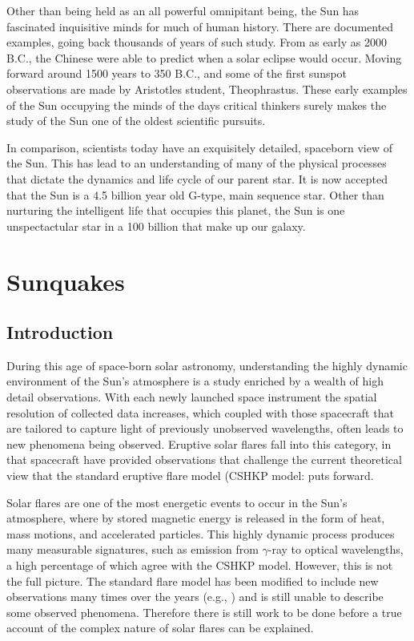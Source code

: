 Other than being held as an all powerful omnipitant being, the Sun has fascinated inquisitive minds for much of human history. There are documented examples, going back thousands of years of such study. From as early as 2000 B.C., the Chinese were able to predict when a solar eclipse would occur. Moving forward around 1500 years to 350 B.C., and some of the first sunspot observations are made by Aristotles student, Theophrastus. These early examples of the Sun occupying the minds of the days critical thinkers surely makes the study of the Sun one of the oldest scientific pursuits.      


In comparison, scientists today have an exquisitely detailed, spaceborn view of the Sun. This has lead to an understanding of many of the physical processes that dictate the dynamics and life cycle of our parent star. It is now accepted that the Sun is a 4.5 billion year old G-type, main sequence star. Other than nurturing the intelligent life that occupies this planet, the Sun is one unspectactular star in a 100 billion that make up our galaxy.

\section{Sunquakes}
\subsection{Introduction}


During this age of space-born solar astronomy, understanding the highly dynamic environment of the Sun's atmosphere is a study enriched by a wealth of high detail observations. With each newly launched space instrument the spatial resolution of collected data increases, which coupled with those spacecraft that are tailored to capture light of previously unobserved wavelengths, often leads to new phenomena being observed. Eruptive solar flares fall into this category, in that spacecraft have provided observations that challenge the current theoretical view that the standard eruptive flare model (CSHKP model: \citep{1964NASSP..50..451C, 1966Natur.211..695S, 1974SoPh...34..323H, 1976SoPh...50...85K} puts forward.

Solar flares are one of the most energetic events to occur in the Sun's atmosphere, where by stored magnetic energy is released in the form of heat, mass motions, and accelerated particles. This highly dynamic process produces many measurable signatures, such as emission from $\gamma$-ray to optical wavelengths, a high percentage of which agree with the CSHKP model. However, this is not the full picture. The standard flare model has been modified to include new observations many times over the years (e.g., \cite{2011LRSP....8....6S}) and is still unable to describe some observed phenomena. Therefore there is still work to be done before a true account of the complex nature of solar flares can be explained.

